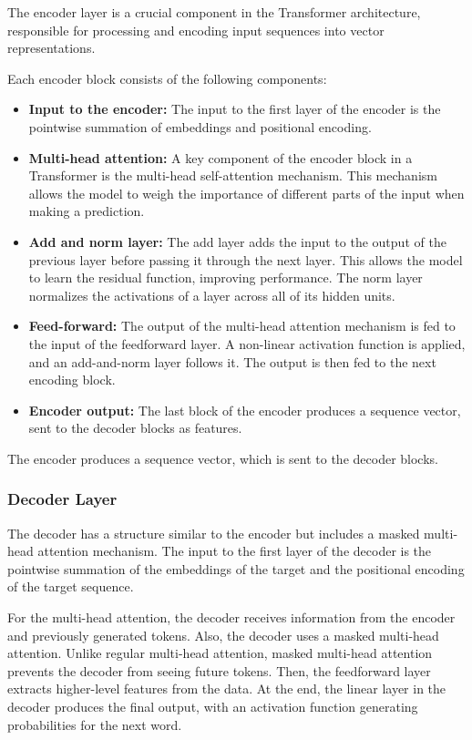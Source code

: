 The encoder layer is a crucial component in the Transformer architecture, responsible for processing and encoding input sequences into vector representations.

Each encoder block consists of the following components:
\begin{itemize}
    \item \textbf{Input to the encoder:} The input to the first layer of the encoder is the pointwise summation of embeddings and positional encoding.
    \item \textbf{Multi-head attention:} A key component of the encoder block in a Transformer is the multi-head self-attention mechanism. This mechanism allows the model to weigh the importance of different parts of the input when making a prediction.
    \item \textbf{Add and norm layer:} The add layer adds the input to the output of the previous layer before passing it through the next layer. This allows the model to learn the residual function, improving performance. The norm layer normalizes the activations of a layer across all of its hidden units.
    \item \textbf{Feed-forward:} The output of the multi-head attention mechanism is fed to the input of the feedforward layer. A non-linear activation function is applied, and an add-and-norm layer follows it. The output is then fed to the next encoding block.
    \item \textbf{Encoder output:} The last block of the encoder produces a sequence vector, sent to the decoder blocks as features.
\end{itemize}

The encoder produces a sequence vector, which is sent to the decoder blocks.

\subsubsection*{Decoder Layer}
The decoder has a structure similar to the encoder but includes a masked multi-head attention mechanism. The input to the first layer of the decoder is the pointwise summation of the embeddings of the target and the positional encoding of the target sequence.

For the multi-head attention, the decoder receives information from the encoder and previously generated tokens. Also, the decoder uses a masked multi-head attention. Unlike regular multi-head attention, masked multi-head attention prevents the decoder from seeing future tokens. Then, the feedforward layer extracts higher-level features from the data. At the end, the linear layer in the decoder produces the final output, with an activation function generating probabilities for the next word.

